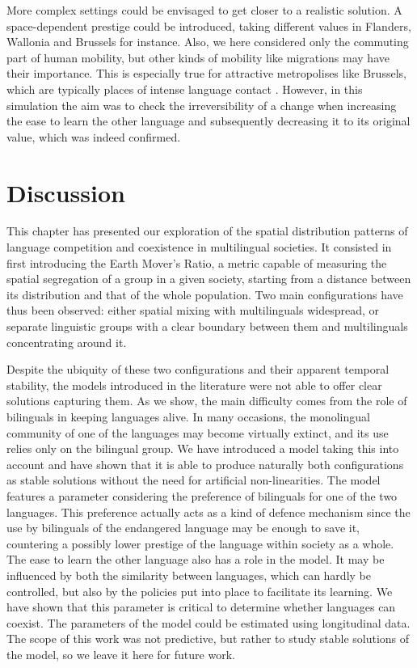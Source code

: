 \documentclass[../thesis.tex]{subfiles}
\begin{document}
More complex settings could be envisaged to get closer to a realistic solution. A
space-dependent prestige could be introduced, taking different values in Flanders,
Wallonia and Brussels for instance. Also, we here considered only the commuting part of
human mobility, but other kinds of mobility like migrations may have their importance.
This is especially true for attractive metropolises like Brussels, which are typically
places of intense language contact \cite{SimonCitiesTranslation2011}. However, in this
simulation the aim was to check the irreversibility of a change when increasing the ease
to learn the other language and subsequently decreasing it to its original value, which
was indeed confirmed. 



\section{Discussion}
This chapter has presented our exploration of the spatial distribution patterns of language competition
and coexistence in multilingual societies. It consisted in first introducing the Earth
Mover's Ratio, a metric capable of measuring the spatial segregation of a group in a
given society, starting from a distance between its distribution and that of the whole
population. Two main configurations have thus been observed: either spatial mixing with
multilinguals widespread, or separate linguistic groups with a clear boundary between
them and multilinguals concentrating around it. 

Despite the ubiquity of these two configurations and their apparent temporal stability,
the models introduced in the literature were not able to offer clear solutions capturing
them. As we show, the main difficulty comes from the role of bilinguals in keeping
languages alive. In many occasions, the monolingual community of one of the languages
may become virtually extinct, and its use relies only on the bilingual group. We have
introduced a model taking this into account and have shown that it is able to produce
naturally both configurations as stable solutions without the need for artificial
non-linearities. The model features a parameter considering the preference of bilinguals
for one of the two languages. This preference actually acts as a kind of defence
mechanism since the use by bilinguals of the endangered language may be enough to save
it, countering a possibly lower prestige of the language within society as a whole. The
ease to learn the other language also has a role in the model. It may be influenced by
both the similarity between languages, which can hardly be controlled, but also by the
policies put into place to facilitate its learning. We have shown that this parameter is
critical to determine whether languages can coexist. The parameters of the model could
be estimated using longitudinal data. The scope of this work was not predictive, but
rather to study stable solutions of the model, so we leave it here for future work.
\end{document}
